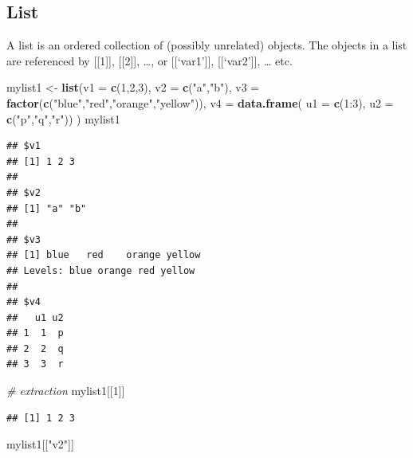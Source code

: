 \documentclass[]{book}
\newenvironment{Shaded}{\begin{snugshade}}{\end{snugshade}}
\newcommand{\KeywordTok}[1]{\textcolor[rgb]{0.13,0.29,0.53}{\textbf{{#1}}}}
\newcommand{\DataTypeTok}[1]{\textcolor[rgb]{0.13,0.29,0.53}{{#1}}}
\newcommand{\DecValTok}[1]{\textcolor[rgb]{0.00,0.00,0.81}{{#1}}}
\newcommand{\StringTok}[1]{\textcolor[rgb]{0.31,0.60,0.02}{{#1}}}
\newcommand{\CommentTok}[1]{\textcolor[rgb]{0.56,0.35,0.01}{\textit{{#1}}}}
\newcommand{\NormalTok}[1]{{#1}}
\theoremstyle{definition}
\theoremstyle{definition}
\theoremstyle{remark}
\begin{document}
\subsection{List}\label{list}

A list is an ordered collection of (possibly unrelated) objects. The
objects in a list are referenced by {[}{[}1{]}{]}, {[}{[}2{]}{]},
\ldots{}, or {[}{[}`var1'{]}{]}, {[}{[}`var2'{]}{]}, \ldots{} etc.

\begin{Shaded}
\begin{Highlighting}[]
\NormalTok{mylist1 <-}\StringTok{ }\KeywordTok{list}\NormalTok{(}\DataTypeTok{v1 =} \KeywordTok{c}\NormalTok{(}\DecValTok{1}\NormalTok{,}\DecValTok{2}\NormalTok{,}\DecValTok{3}\NormalTok{),}
             \DataTypeTok{v2 =} \KeywordTok{c}\NormalTok{(}\StringTok{"a"}\NormalTok{,}\StringTok{"b"}\NormalTok{),}
             \DataTypeTok{v3 =} \KeywordTok{factor}\NormalTok{(}\KeywordTok{c}\NormalTok{(}\StringTok{"blue"}\NormalTok{,}\StringTok{"red"}\NormalTok{,}\StringTok{"orange"}\NormalTok{,}\StringTok{"yellow"}\NormalTok{)),}
             \DataTypeTok{v4 =} \KeywordTok{data.frame}\NormalTok{( }\DataTypeTok{u1 =} \KeywordTok{c}\NormalTok{(}\DecValTok{1}\NormalTok{:}\DecValTok{3}\NormalTok{), }\DataTypeTok{u2 =} \KeywordTok{c}\NormalTok{(}\StringTok{"p"}\NormalTok{,}\StringTok{"q"}\NormalTok{,}\StringTok{"r"}\NormalTok{))}
             \NormalTok{)}
\NormalTok{mylist1 }
\end{Highlighting}
\end{Shaded}

\begin{verbatim}
## $v1
## [1] 1 2 3
## 
## $v2
## [1] "a" "b"
## 
## $v3
## [1] blue   red    orange yellow
## Levels: blue orange red yellow
## 
## $v4
##   u1 u2
## 1  1  p
## 2  2  q
## 3  3  r
\end{verbatim}

\begin{Shaded}
\begin{Highlighting}[]
\CommentTok{# extraction}
\NormalTok{mylist1[[}\DecValTok{1}\NormalTok{]]             }
\end{Highlighting}
\end{Shaded}

\begin{verbatim}
## [1] 1 2 3
\end{verbatim}

\begin{Shaded}
\begin{Highlighting}[]
\NormalTok{mylist1[[}\StringTok{"v2"}\NormalTok{]]             }
\end{Highlighting}
\end{Shaded}
\end{document}
